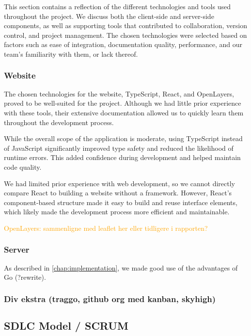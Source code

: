 This section contains a reflection of the different technologies and tools used throughout the project. We discuss both the client-side and server-side components, as well as supporting tools that contributed to collaboration, version control, and project management. The chosen technologies were selected based on factors such as ease of integration, documentation quality, performance, and our team's familiarity with them, or lack thereof.

\subsubsection{Website}

The chosen technologies for the website, TypeScript, React, and OpenLayers, proved to be well-suited for the project. Although we had little prior experience with these tools, their extensive documentation allowed us to quickly learn them throughout the development process.

While the overall scope of the application is moderate, using TypeScript instead of JavaScript significantly improved type safety and reduced the likelihood of runtime errors. This added confidence during development and helped maintain code quality.

We had limited prior experience with web development, so we cannot directly compare React to building a website without a framework. However, React’s component-based structure made it easy to build and reuse interface elements, which likely made the development process more efficient and maintainable.

\textcolor{orange}{OpenLayers: sammenligne med leaflet her eller tidligere i rapporten?}

\subsubsection{Server}

As described in \autoref{chap:implementation}, we made good use of the advantages of Go (?rewrite). 

\subsubsection{Div ekstra (traggo, github org med kanban, skyhigh)}

\subsection{SDLC Model / SCRUM}

